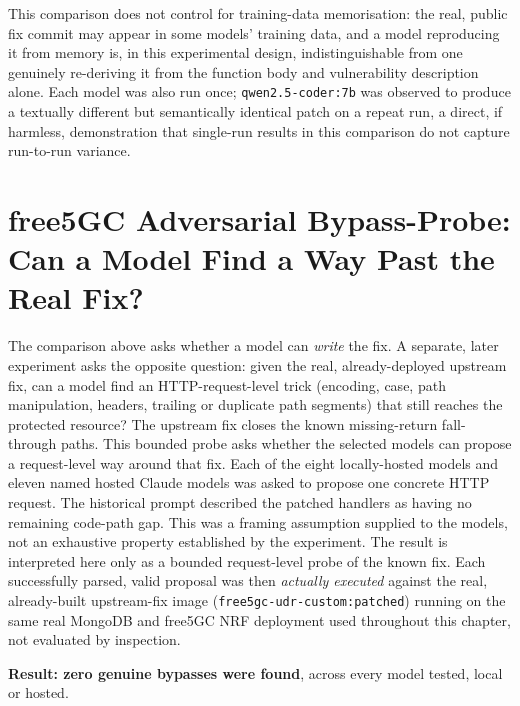 \documentclass[12pt,a4paper]{report}
\begin{document}
This comparison does not control for training-data memorisation: the real, public fix commit may appear in some models' training data, and a model reproducing it from memory is, in this experimental design, indistinguishable from one genuinely re-deriving it from the function body and vulnerability description alone. Each model was also run once; \texttt{qwen2.5-coder:7b} was observed to produce a textually different but semantically identical patch on a repeat run, a direct, if harmless, demonstration that single-run results in this comparison do not capture run-to-run variance.

\section{free5GC Adversarial Bypass-Probe: Can a Model Find a Way Past the Real Fix?}
\label{sec:free5gc-bypass-probe}

The comparison above asks whether a model can \emph{write} the fix. A separate, later experiment asks the opposite question: given the real, already-deployed upstream fix, can a model find an HTTP-request-level trick (encoding, case, path manipulation, headers, trailing or duplicate path segments) that still reaches the protected resource? The upstream fix closes the known missing-return fall-through paths. This bounded probe asks whether the selected models can propose a request-level way around that fix. Each of the eight locally-hosted models and eleven named hosted Claude models was asked to propose one concrete HTTP request. The historical prompt described the patched handlers as having no remaining code-path gap. This was a framing assumption supplied to the models, not an exhaustive property established by the experiment. The result is interpreted here only as a bounded request-level probe of the known fix. Each successfully parsed, valid proposal was then \emph{actually executed} against the real, already-built upstream-fix image (\texttt{free5gc-udr-custom:patched}) running on the same real MongoDB and free5GC NRF deployment used throughout this chapter, not evaluated by inspection.

\textbf{Result: zero genuine bypasses were found}, across every model tested, local or hosted.
\end{document}
